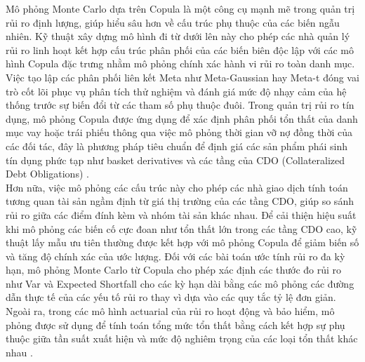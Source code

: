 Mô phỏng Monte Carlo dựa trên Copula là một công cụ mạnh mẽ trong quản trị rủi ro định lượng, giúp hiểu sâu hơn về cấu trúc phụ thuộc của các biến ngẫu nhiên. Kỹ thuật xây dựng mô hình đi từ dưới lên này cho phép các nhà quản lý rủi ro linh hoạt kết hợp cấu trúc phân phối của các biến biên độc lập với các mô hình Copula đặc trưng nhằm mô phỏng chính xác hành vi rủi ro toàn danh mục. Việc tạo lập các phân phối liên kết Meta như Meta-Gaussian hay Meta-t đóng vai trò cốt lõi phục vụ phân tích thử nghiệm và đánh giá mức độ nhạy cảm của hệ thống trước sự biến đổi từ các tham số phụ thuộc đuôi. Trong quản trị rủi ro tín dụng, mô phỏng Copula được ứng dụng để xác định phân phối tổn thất của danh mục vay hoặc trái phiếu thông qua việc mô phỏng thời gian vỡ nợ đồng thời của các đối tác, đây là phương pháp tiêu chuẩn để định giá các sản phẩm phái sinh tín dụng phức tạp như basket derivatives và các tầng của CDO (Collateralized Debt Obligations) \cite{hull2006implied}. \\
Hơn nữa, việc mô phỏng các cấu trúc này cho phép các nhà giao dịch tính toán tương quan tài sản ngầm định từ giá thị trường của các tầng CDO, giúp so sánh rủi ro giữa các điểm đính kèm và nhóm tài sản khác nhau. Để cải thiện hiệu suất khi mô phỏng các biến cố cực đoan như tổn thất lớn trong các tầng CDO cao, kỹ thuật lấy mẫu ưu tiên thường được kết hợp với mô phỏng Copula để giảm biến số và tăng độ chính xác của ước lượng. Đối với các bài toán ước tính rủi ro đa kỳ hạn, mô phỏng Monte Carlo từ Copula cho phép xác định các thước đo rủi ro như Var và Expected Shortfall cho các kỳ hạn dài bằng các mô phỏng các đường dẫn thực tế của các yếu tố rủi ro thay vì dựa vào các quy tắc tỷ lệ đơn giản. Ngoài ra, trong các mô hình actuarial của rủi ro hoạt động và bảo hiểm, mô phỏng được sử dụng để tính toán tổng mức tổn thất bằng cách kết hợp sự phụ thuộc giữa tần suất xuất hiện và mức độ nghiêm trọng của các loại tổn thất khác nhau \cite{mai2012simulating}.
